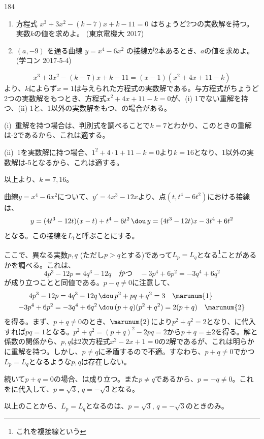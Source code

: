 \begin{prob}{184}{}{}
 \begin{enumerate}
  \item 方程式 $x^3+3x^2-(k-7)x+k-11=0$ はちょうど2つの実数解を持つ。実数$k$の値を求めよ。  (東京電機大 2017)
  \item $(a,-9)$ を通る曲線 $y=x^4-6x^2$ の接線が2本あるとき、$a$の値を求めよ。  (学コン 2017-5-4)
 \end{enumerate}
\end{prob}

\[ x^3+3x^2-(k-7)x+k-11=(x-1)(x^2+4x+11-k) \]
より、$k$によらず$x=1$は与えられた方程式の実数解である。与方程式がちょうど2つの実数解をもつとき、方程式$x^2+4x+11-k=0$が、(i) 1でない重解を持つ、(ii) 1と、1以外の実数解をもつ、の場合がある。

(i)~重解を持つ場合は、判別式を調べることで$k=7$とわかり、このときの重解は-2であるから、これは適する。

(ii)~1を実数解に持つ場合、$1^2+4\cdot 1+11-k=0$より$k=16$となり、1以外の実数解は-5となるから、これは適する。

以上より、$k=7, 16$。

曲線$y=x^4-6x^2$について、$y'=4x^3-12x$より、点$(t, t^4-6t^2)$における接線は、
\[ y=(4t^3-12t)(x-t)+t^4-6t^2 \,\dou\, y=(4t^3-12t)x-3t^4+6t^2 \]
となる。この接線を$L_t$と呼ぶことにする。

ここで、異なる実数$p, q$ (ただし$p>q$とする)であって$L_p=L_q$となる\footnote{これを複接線という}ことがあるかを調べる。これは、
\[ 4p^3-12p=4q^3-12q \quad\text{かつ}\quad -3p^4+6p^2=-3q^4+6q^2 \]
が成り立つことと同値である。$p-q\neq 0$に注意して、
\begin{align*}
 4p^3-12p=4q^3-12q \,&\dou\, p^2+pq+q^2=3 \quad \marunum{1} \\
 -3p^4+6p^2=-3q^4+6q^2 \,&\dou\, (p+q)(p^2+q^2)=2(p+q) \quad \marunum{2}
\end{align*}
を得る。まず、$p+q\neq 0$のとき、$\marunum{2}$により$p^2+q^2=2$となり、に代入すれば$pq=1$となる。$p^2+q^2=(p+q)^2-2pq=2$から$p+q=\pm 2$を得る。解と係数の関係から、$p, q$は2次方程式$x^2-2x+1=0$の2解であるが、これは明らかに重解を持つ。しかし、$p\neq q$に矛盾するので不適。すなわち、$p+q\neq 0$でかつ$L_p=L_q$となるような$p, q$は存在しない。

続いて$p+q=0$の場合、は成り立つ。また$p\neq q$であるから、$p=-q\neq 0$。これをに代入して、$p=\sqrt{3}$, $q=-\sqrt{3}$となる。

以上のことから、$L_p=L_q$となるのは、$p=\sqrt{3}$, $q=-\sqrt{3}$のときのみ。

